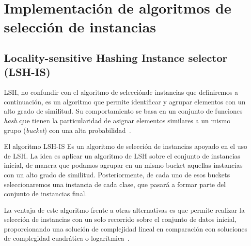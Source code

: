 \section{Implementación de algoritmos de selección de instancias}



\subsection{Locality-sensitive Hashing Instance selector (LSH-IS)}

LSH, no confundir con el algoritmo de selecciónde instancias que definiremos a continuación, es un algoritmo que permite identificar y agrupar elementos con un alto grado de similitud. Su comportamiento se basa en un conjunto de funciones \textit{hash} que tienen la particularidad de asignar elementos similares a un mismo grupo (\textit{bucket}) con una alta probabilidad~\cite{LSHISPaper}.

El algoritmo LSH-IS Es un algoritmo de selección de instancias apoyado en el uso de LSH. La idea es aplicar un  algoritmo de LSH sobre el conjunto de instancias inicial, de manera que podamos agrupar en un mismo bucket aquellas instancias con un alto grado de similitud. Posteriormente, de cada uno de esos buckets seleccionaremos una instancia de cada clase, que pasará a formar parte del conjunto de instancias final. 

La ventaja de este algoritmo frente a otras alternativas es que permite realizar la selección de instancias con un solo recorrido sobre el conjunto de datos inicial, proporcionando una solución de complejidad lineal en comparación con soluciones de complegidad cuadrática o logarítmica~\cite{LSHISPaper}.









